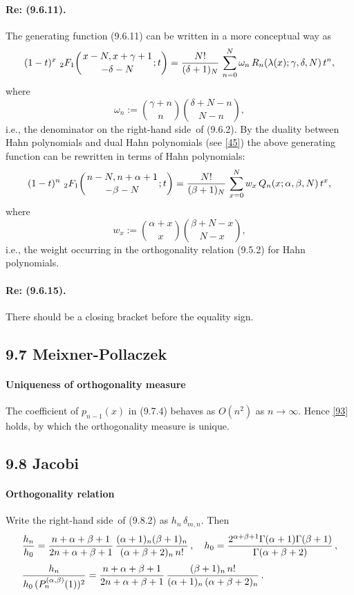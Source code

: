 \documentclass[twoside,11pt]{article}
\newcommand\sa{\smallskipamount}
\newcommand\sLP{\\[\sa]}
\newcommand\al\alpha
\newcommand\be\beta
\newcommand\ga\gamma
\newcommand\de\delta
\newcommand\la\lambda
\newcommand\om\omega
\newcommand\Ga{\Gamma}
\newcommand\iy\infty
\newcommand{\hyp}[5]{\,\mbox{}_{#1}F_{#2}\!\left(
  \genfrac{}{}{0pt}{}{#3}{#4};#5\right)}
\newcommand\RHS{right-hand side}
\begin{document}
\paragraph{Re: (9.6.11).}
The generating function (9.6.11) can be written in a more conceptual way as
\begin{equation}
(1-t)^x\,\hyp21{x-N,x+\ga+1}{-\de-N}t=\frac{N!}{(\de+1)_N}\,
\sum_{n=0}^N \om_n\,R_n(\la(x);\ga,\de,N)\,t^n,
\label{2}
\end{equation}
where
\begin{equation}
\om_n:=\binom{\ga+n}n \binom{\de+N-n}{N-n},
\label{3}
\end{equation}
i.e., the denominator on the \RHS\ of (9.6.2).
By the duality between Hahn polynomials and dual Hahn polynomials (see \eqref{45}) the above generating function can be rewritten in
terms of Hahn polynomials:
\begin{equation}
(1-t)^n\,\hyp21{n-N,n+\al+1}{-\be-N}t=\frac{N!}{(\be+1)_N}\,
\sum_{x=0}^N w_x\,Q_n(x;\al,\be,N)\,t^x,
\label{4}
\end{equation}
where
\begin{equation}
w_x:=\binom{\al+x}x \binom{\be+N-x}{N-x},
\label{5}
\end{equation}
i.e., the weight occurring in the orthogonality relation (9.5.2)
for Hahn polynomials.
\paragraph{Re: (9.6.15).}
There should be a closing bracket before the equality sign.
%
\subsection*{9.7 Meixner-Pollaczek}
\label{sec9.7}
%
\paragraph{Uniqueness of orthogonality measure}
The coefficient of $p_{n-1}(x)$ in (9.7.4) behaves as $O(n^2)$ as $n\to\iy$.
Hence \eqref{93} holds, by which the orthogonality measure is unique.
%
\subsection*{9.8 Jacobi}
\label{sec9.8}
%
\paragraph{Orthogonality relation}
Write the \RHS\ of (9.8.2) as $h_n\,\de_{m,n}$. Then
\begin{equation}
\begin{split}
&\frac{h_n}{h_0}=
\frac{n+\al+\be+1}{2n+\al+\be+1}\,
\frac{(\al+1)_n(\be+1)_n}{(\al+\be+2)_n\,n!}\,,\quad
h_0=\frac{2^{\al+\be+1}\Ga(\al+1)\Ga(\be+1)}{\Ga(\al+\be+2)}\,,\sLP
&\frac{h_n}{h_0\,(P_n^{(\al,\be)}(1))^2}=
\frac{n+\al+\be+1}{2n+\al+\be+1}\,
\frac{(\be+1)_n\,n!}{(\al+1)_n\,(\al+\be+2)_n}\,.
\end{split}
\label{60}
\end{equation}
\end{document}
